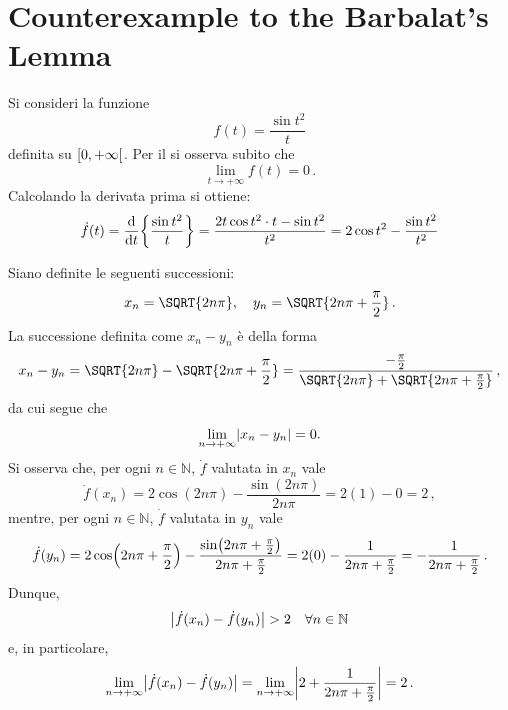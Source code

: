 \documentclass[a4paper,12pt]{article}
\begin{document}
\section{Counterexample to the Barbalat's Lemma}
\begin{example}
Si consideri la funzione
\begin{equation}
    f(t) = \frac{\sin t^2}{t}
\end{equation}
definita su $\interval[open right]{0}{+\infty}$. Per il  si osserva subito che
\begin{equation*}
    \lim_{t \to +\infty} f(t) = 0 \,.
\end{equation*}
Calcolando la derivata prima si ottiene:
\begin{equation*}
    \dot{f}(t) = \diff*{\mleft\{\frac{\sin t^2}{t}\mright\}}{t} = \frac{2t \cos t^2 \cdot t - \sin t^2}{t^2} = 2\cos t^2 - \frac{\sin t^2}{t^2}
\end{equation*}

\smallskip
Siano definite le seguenti successioni:
\begin{equation*}
    x_n = \SQRT{2n\pi}, \quad y_n = \SQRT{2n\pi + \frac{\pi}{2}} \,.
\end{equation*}
La successione definita come $x_n - y_n$ è della forma
\begin{equation*}
    x_n - y_n = \SQRT{2n\pi} - \SQRT{2n\pi + \frac{\pi}{2}} = \frac{-\frac{\pi}{2}}{\SQRT{2n\pi} + \SQRT{2n\pi + \frac{\pi}{2}}} \,,
\end{equation*}
da cui segue che
\begin{equation}\label{eq:barbalat_contr5}
    \lim_{n \to +\infty} \mleft| x_n - y_n \mright| = 0.
\end{equation}
Si osserva che, per ogni $n \in \mathbb{N}$, $\dot{f}$ valutata in $x_n$ vale
\begin{equation*}
    \dot{f}(x_n) = 2\cos(2n\pi) - \frac{\sin(2n\pi)}{2n\pi} = 2(1) - 0 = 2 \, ,
\end{equation*}
mentre, per ogni $n \in \mathbb{N}$, $\dot{f}$ valutata in $y_n$ vale
\begin{equation*}
    \dot{f}(y_n) = 2\cos\mleft(2n\pi + \frac{\pi}{2}\mright) - \frac{\sin\mleft(2n\pi + \frac{\pi}{2}\mright)}{2n\pi + \frac{\pi}{2}} = 2(0) - \frac{1}{2n\pi + \frac{\pi}{2}} = - \frac{1}{2n\pi + \frac{\pi}{2}} \,.
\end{equation*}
Dunque, 
\begin{equation*}
  \mleft| \dot{f}(x_n) - \dot{f}(y_n) \mright| > 2 \quad \forall n \in \mathbb{N}
\end{equation*}
e, in particolare,
\begin{equation*}
    \lim_{n \to +\infty} \mleft| \dot{f}(x_n) - \dot{f}(y_n) \mright| = \lim_{n \to +\infty} \mleft| 2 + \frac{1}{2n\pi + \frac{\pi}{2}} \mright| = 2 \,.
\end{equation*}


\end{example}
\end{document}
